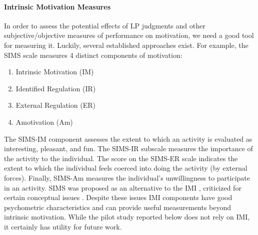 \paragraph{Intrinsic Motivation Measures}

In order to assess the potential effects of \ac{LP} judgments and other subjective/objective measures of performance on motivation, we need a good tool for measuring it. Luckily, several established approaches exist. For example, the \acf{SIMS} scale \parencite{guay_assessment_2000} measures 4 distinct components of motivation:
\begin{enumerate}
  \item Intrinsic Motivation (IM)
  \item Identified Regulation (IR)
  \item External Regulation (ER)
  \item Amotivation (Am)
\end{enumerate}
The \ac{SIMS}-IM component assesses the extent to which an activity is evaluated as interesting, pleasant, and fun. The \ac{SIMS}-IR subscale measures the importance of the activity to the individual. The score on the \ac{SIMS}-ER scale indicates the extent to which the individual feels coerced into doing the activity (by external forces). Finally, \ac{SIMS}-Am measures the individual's unwillingness to participate in an activity. \ac{SIMS} was proposed as an alternative to the \acf{IMI} \parencite{mcauley_psychometric_1989}, criticized for certain conceptual issues \parencite{guay_assessment_2000}. Despite these issues \ac{IMI} components have good psychometric characteristics and can provide useful measurements beyond intrinsic motivation. While the pilot study reported below does not rely on \ac{IMI}, it certainly has utility for future work.

